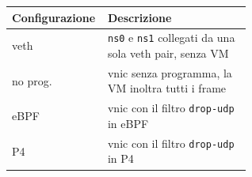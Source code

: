 \begin{tabular}{@{}l >{\raggedright\arraybackslash}p{0.6\linewidth}@{}}
    \toprule
    \textbf{Configurazione} & \textbf{Descrizione} \\
    \midrule
    veth & \texttt{ns0} e \texttt{ns1} collegati da una sola veth pair, senza VM \\
    no prog. & vnic senza programma, la VM inoltra tutti i frame \\
    eBPF & vnic con il filtro \texttt{drop-udp} in eBPF \\
    P4 & vnic con il filtro \texttt{drop-udp} in P4 \\
        \bottomrule
\end{tabular}